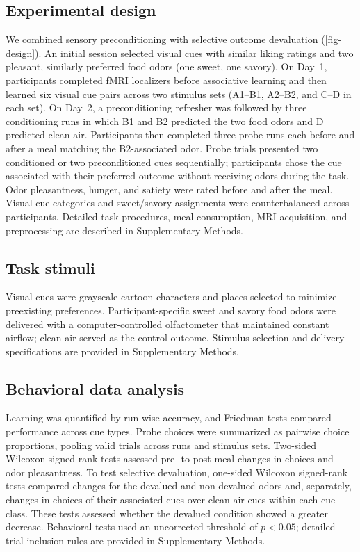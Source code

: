 \documentclass[12pt,letterpaper]{article}
\begin{document}
\subsection*{Experimental design}

We combined sensory preconditioning with selective outcome devaluation (\autoref{fig-design}). An initial session selected visual cues with similar liking ratings and two pleasant, similarly preferred food odors (one sweet, one savory). On Day~1, participants completed fMRI localizers before associative learning and then learned six visual cue pairs across two stimulus sets (A1--B1, A2--B2, and C--D in each set). On Day~2, a preconditioning refresher was followed by three conditioning runs in which B1 and B2 predicted the two food odors and D predicted clean air. Participants then completed three probe runs each before and after a meal matching the B2-associated odor. Probe trials presented two conditioned or two preconditioned cues sequentially; participants chose the cue associated with their preferred outcome without receiving odors during the task. Odor pleasantness, hunger, and satiety were rated before and after the meal. Visual cue categories and sweet/savory assignments were counterbalanced across participants. Detailed task procedures, meal consumption, MRI acquisition, and preprocessing are described in Supplementary Methods.

\subsection*{Task stimuli}

Visual cues were grayscale cartoon characters and places selected to minimize preexisting preferences. Participant-specific sweet and savory food odors were delivered with a computer-controlled olfactometer that maintained constant airflow; clean air served as the control outcome. Stimulus selection and delivery specifications are provided in Supplementary Methods.

\subsection*{Behavioral data analysis}

Learning was quantified by run-wise accuracy, and Friedman tests compared performance across cue types. Probe choices were summarized as pairwise choice proportions, pooling valid trials across runs and stimulus sets. Two-sided Wilcoxon signed-rank tests assessed pre- to post-meal changes in choices and odor pleasantness. To test selective devaluation, one-sided Wilcoxon signed-rank tests compared changes for the devalued and non-devalued odors and, separately, changes in choices of their associated cues over clean-air cues within each cue class. These tests assessed whether the devalued condition showed a greater decrease. Behavioral tests used an uncorrected threshold of $p < 0.05$; detailed trial-inclusion rules are provided in Supplementary Methods.
\end{document}
